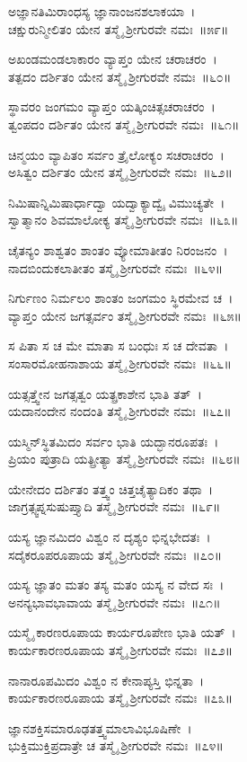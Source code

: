 ಅಜ್ಞಾನತಿಮಿರಾಂಧಸ್ಯ ಜ್ಞಾನಾಂಜನಶಲಾಕಯಾ~।\\
ಚಕ್ಷುರುನ್ಮೀಲಿತಂ ಯೇನ ತಸ್ಮೈ ಶ್ರೀಗುರವೇ ನಮಃ~॥೫೯॥

ಅಖಂಡಮಂಡಲಾಕಾರಂ ವ್ಯಾಪ್ತಂ ಯೇನ ಚರಾಚರಂ~।\\
ತತ್ಪದಂ ದರ್ಶಿತಂ ಯೇನ ತಸ್ಮೈ ಶ್ರೀಗುರವೇ ನಮಃ~॥೬೦॥

ಸ್ಥಾವರಂ ಜಂಗಮಂ ವ್ಯಾಪ್ತಂ ಯತ್ಕಿಂಚಿತ್ಸಚರಾಚರಂ~।\\
ತ್ವಂಪದಂ ದರ್ಶಿತಂ ಯೇನ ತಸ್ಮೈ ಶ್ರೀಗುರವೇ ನಮಃ~॥೬೧॥

ಚಿನ್ಮಯಂ ವ್ಯಾಪಿತಂ ಸರ್ವಂ ತ್ರೈಲೋಕ್ಯಂ ಸಚರಾಚರಂ~।\\
ಅಸಿತ್ವಂ ದರ್ಶಿತಂ ಯೇನ ತಸ್ಮೈ ಶ್ರೀಗುರವೇ ನಮಃ~॥೬೨॥

ನಿಮಿಷಾನ್ನಿಮಿಷಾರ್ಧಾದ್ವಾ ಯದ್ವಾಕ್ಯಾದ್ವೈ ವಿಮುಚ್ಯತೇ~।\\
ಸ್ವಾತ್ಮಾನಂ ಶಿವಮಾಲೋಕ್ಯ ತಸ್ಮೈ ಶ್ರೀಗುರವೇ ನಮಃ~॥೬೩॥

ಚೈತನ್ಯಂ ಶಾಶ್ವತಂ ಶಾಂತಂ ವ್ಯೋಮಾತೀತಂ ನಿರಂಜನಂ~।\\
ನಾದಬಿಂದುಕಲಾತೀತಂ ತಸ್ಮೈ ಶ್ರೀಗುರವೇ ನಮಃ~॥೬೪॥

ನಿರ್ಗುಣಂ ನಿರ್ಮಲಂ ಶಾಂತಂ ಜಂಗಮಂ ಸ್ಥಿರಮೇವ ಚ~।\\
ವ್ಯಾಪ್ತಂ ಯೇನ ಜಗತ್ಸರ್ವಂ ತಸ್ಮೈ ಶ್ರೀಗುರವೇ ನಮಃ~॥೬೫॥

ಸ ಪಿತಾ ಸ ಚ ಮೇ ಮಾತಾ ಸ ಬಂಧುಃ ಸ ಚ ದೇವತಾ~।\\
ಸಂಸಾರಮೋಹನಾಶಾಯ ತಸ್ಮೈ ಶ್ರೀಗುರವೇ ನಮಃ~॥೬೬॥

ಯತ್ಸತ್ತ್ವೇನ ಜಗತ್ಸತ್ವಂ ಯತ್ಪ್ರಕಾಶೇನ ಭಾತಿ ತತ್~।\\
ಯದಾನಂದೇನ ನಂದಂತಿ ತಸ್ಮೈ ಶ್ರೀಗುರವೇ ನಮಃ~॥೬೭॥

ಯಸ್ಮಿನ್‌ಸ್ಥಿತಮಿದಂ ಸರ್ವಂ ಭಾತಿ ಯದ್ಭಾನರೂಪತಃ~।\\
ಪ್ರಿಯಂ ಪುತ್ರಾದಿ ಯತ್ಪ್ರೀತ್ಯಾ ತಸ್ಮೈ ಶ್ರೀಗುರವೇ ನಮಃ~॥೬೮॥

ಯೇನೇದಂ ದರ್ಶಿತಂ ತತ್ತ್ವಂ ಚಿತ್ತಚೈತ್ಯಾದಿಕಂ ತಥಾ~।\\
ಜಾಗ್ರತ್ಸ್ವಪ್ನಸುಷುಪ್ತ್ಯಾದಿ ತಸ್ಮೈ ಶ್ರೀಗುರವೇ ನಮಃ~॥೬೯॥

ಯಸ್ಯ ಜ್ಞಾನಮಿದಂ ವಿಶ್ವಂ ನ ದೃಶ್ಯಂ ಭಿನ್ನಭೇದತಃ~।\\
ಸದೈಕರೂಪರೂಪಾಯ ತಸ್ಮೈ ಶ್ರೀಗುರವೇ ನಮಃ~॥೭೦॥

ಯಸ್ಯ ಜ್ಞಾತಂ ಮತಂ ತಸ್ಯ ಮತಂ ಯಸ್ಯ ನ ವೇದ ಸಃ~।\\
ಅನನ್ಯಭಾವಭಾವಾಯ ತಸ್ಮೈ ಶ್ರೀಗುರವೇ ನಮಃ~॥೭೧॥

ಯಸ್ಮೈ ಕಾರಣರೂಪಾಯ ಕಾರ್ಯರೂಪೇಣ ಭಾತಿ ಯತ್~।\\
ಕಾರ್ಯಕಾರಣರೂಪಾಯ ತಸ್ಮೈ ಶ್ರೀಗುರವೇ ನಮಃ~॥೭೨॥

ನಾನಾರೂಪಮಿದಂ ವಿಶ್ವಂ ನ ಕೇನಾಪ್ಯಸ್ತಿ ಭಿನ್ನತಾ~।\\
ಕಾರ್ಯಕಾರಣರೂಪಾಯ ತಸ್ಮೈ ಶ್ರೀಗುರವೇ ನಮಃ~॥೭೩॥

ಜ್ಞಾನಶಕ್ತಿಸಮಾರೂಢತತ್ತ್ವಮಾಲಾವಿಭೂಷಿಣೇ~।\\
ಭುಕ್ತಿಮುಕ್ತಿಪ್ರದಾತ್ರೇ ಚ ತಸ್ಮೈ ಶ್ರೀಗುರವೇ ನಮಃ~॥೭೪॥

